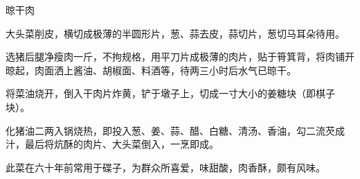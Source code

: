%
%
%
%
%
%
%
\begin{recipe}{晾干肉}

\ingredients


\preparation

\step 大头菜削皮，横切成极薄的半圆形片，葱、蒜去皮，蒜切片，葱切马耳朵待用。

\step 选猪后腿净瘦肉一斤，不拘规格，用平刀片成极薄的肉片，贴于筲箕背，将肉铺开
晾起，肉面洒上酱油、胡椒面、料酒等，待两三小时后水气已晾干。

\step 将菜油烧开，倒入干肉片炸黄，铲于墩子上，切成一寸大小的姜糖块（即棋子块）。

\step 化猪油二两入锅烧热，即投入葱、姜、蒜、醋、白糖、清汤、香油，勾二流芡成
汁，最后将炕酥的肉片、大头菜倒入，一烹即成。

\features

此菜在六十年前常用于碟子，为群众所喜爱，味甜酸，肉香酥，颇有风味。

\end{recipe}

